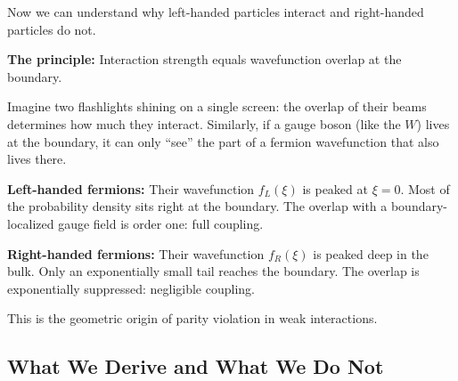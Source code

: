 Now we can understand why left-handed particles interact and right-handed
particles do not.

\textbf{The principle:} Interaction strength equals wavefunction overlap at the
boundary.

Imagine two flashlights shining on a single screen: the overlap of their beams
determines how much they interact. Similarly, if a gauge boson (like the $W$)
lives at the boundary, it can only ``see'' the part of a fermion wavefunction
that also lives there.

\textbf{Left-handed fermions:} Their wavefunction $f_L(\xi)$ is peaked at $\xi = 0$.
Most of the probability density sits right at the boundary. The overlap with
a boundary-localized gauge field is order one: full coupling.

\textbf{Right-handed fermions:} Their wavefunction $f_R(\xi)$ is peaked deep in
the bulk. Only an exponentially small tail reaches the boundary. The overlap
is exponentially suppressed: negligible coupling.

This is the geometric origin of parity violation in weak interactions.


\subsection{What We Derive and What We Do Not}

